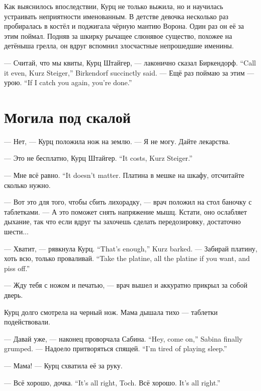 Как выяснилось впоследствии, Курц не только выжила, но и научилась устраивать неприятности именованным.
В детстве девочка несколько раз пробиралась в костёл и поджигала чёрную мантию Ворона.
Один раз он её за этим поймал.
Подняв за шкирку рычащее слюнявое существо, похожее на детёныша грелла\FM, он вдруг вспомнил злосчастные непрошедшие именины.

{--- Считай, что мы квиты, Курц Штайгер, --- лаконично сказал Биркендорф.}
{``Call it even, Kurz Steiger,'' Birkendorf succinctly said.}
{--- Ещё раз поймаю за этим --- урою.}
{``If I catch you again, you're done.''}

\section{Могила под скалой}

--- Нет, --- Курц положила нож на землю.
--- Я не могу.
Дайте лекарства.

{--- Это не бесплатно, Курц Штайгер.}
{``It costs, Kurz Steiger.''}

{--- Мне всё равно.}
{``It doesn't matter.}
Платина в мешке на шкафу, отсчитайте сколько нужно.

--- Вот это для того, чтобы сбить лихорадку, --- врач положил на стол баночку с таблетками.
--- А это поможет снять напряжение мышц.
Кстати, оно ослабляет дыхание, так что если вдруг ты захочешь сделать передозировку, достаточно шести...

{--- Хватит, --- рявкнула Курц.}
{``That's enough,'' Kurz barked.}
{--- Забирай платину, хоть всю, только проваливай.}
{``Take the platine, all the platine if you want, and piss off.''}

--- Жду тебя с ножом и печатью, --- врач вышел и аккуратно прикрыл за собой дверь.

Курц долго смотрела на черный нож.
Мама дышала тихо --- таблетки подействовали.

{--- Давай уже, --- наконец проворчала Сабина.}
{``Hey, come on,'' Sabina finally grumped.}
{--- Надоело притворяться спящей.}
{``I'm tired of playing sleep.''}

--- Мама! --- Курц схватила её за руку.

{--- Всё хорошо, дочка.}
{``It's all right, Toch.}
{Всё хорошо.}
{It's all right.''}

